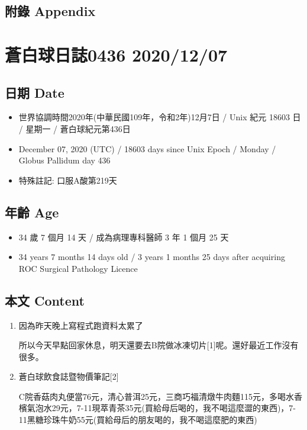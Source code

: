 \documentclass[
]{article}
\providecommand{\tightlist}{%
  \setlength{\itemsep}{0pt}\setlength{\parskip}{0pt}}
\begin{document}
\hypertarget{ux9644ux9304-appendix-5}{%
\subsection{附錄 Appendix}\label{ux9644ux9304-appendix-5}}

\hypertarget{ux84bcux767dux7403ux65e5ux8a8c0436-20201207}{%
\section{蒼白球日誌0436
2020/12/07}\label{ux84bcux767dux7403ux65e5ux8a8c0436-20201207}}

\hypertarget{ux65e5ux671f-date-6}{%
\subsection{日期 Date}\label{ux65e5ux671f-date-6}}

\begin{itemize}
\tightlist
\item
  世界協調時間2020年(中華民國109年，令和2年)12月7日 / Unix 紀元 18603 日
  / 星期一 / 蒼白球紀元第436日
\item
  December 07, 2020 (UTC) / 18603 days since Unix Epoch / Monday /
  Globus Pallidum day 436
\item
  特殊註記: 口服A酸第219天
\end{itemize}

\hypertarget{ux5e74ux9f61-age-6}{%
\subsection{年齡 Age}\label{ux5e74ux9f61-age-6}}

\begin{itemize}
\tightlist
\item
  34 歲 7 個月 14 天 / 成為病理專科醫師 3 年 1 個月 25 天
\item
  34 years 7 months 14 days old / 3 years 1 months 25 days after
  acquiring ROC Surgical Pathology Licence
\end{itemize}

\hypertarget{ux672cux6587-content-6}{%
\subsection{本文 Content}\label{ux672cux6587-content-6}}

\begin{enumerate}
\def\labelenumi{\arabic{enumi}.}
\item
  因為昨天晚上寫程式跑資料太累了

  所以今天早點回家休息，明天還要去B院做冰凍切片{[}1{]}呢。還好最近工作沒有很多。
\item
  蒼白球飲食誌暨物價筆記{[}2{]}

  C院香菇肉丸便當76元，清心普洱25元，三商巧福清燉牛肉麵115元，多喝水香檳氣泡水29元，7-11現萃青茶35元(買給母后喝的，我不喝這麼澀的東西)，7-11黑糖珍珠牛奶55元(買給母后的朋友喝的，我不喝這麼肥的東西)
\end{enumerate}
\end{document}
